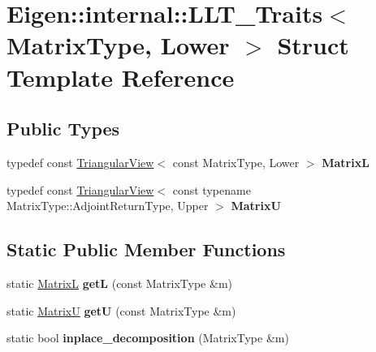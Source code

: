 \hypertarget{struct_eigen_1_1internal_1_1_l_l_t___traits_3_01_matrix_type_00_01_lower_01_4}{}\section{Eigen\+::internal\+::L\+L\+T\+\_\+\+Traits$<$ Matrix\+Type, Lower $>$ Struct Template Reference}
\label{struct_eigen_1_1internal_1_1_l_l_t___traits_3_01_matrix_type_00_01_lower_01_4}
\subsection*{Public Types}
\begin{DoxyCompactItemize}
\item 
\mbox{\label{struct_eigen_1_1internal_1_1_l_l_t___traits_3_01_matrix_type_00_01_lower_01_4_a66962242a7b894516b50903e48eaa502}} 
typedef const \mbox{\hyperlink{class_eigen_1_1_triangular_view}{Triangular\+View}}$<$ const Matrix\+Type, Lower $>$ {\bfseries MatrixL}
\item 
\mbox{\label{struct_eigen_1_1internal_1_1_l_l_t___traits_3_01_matrix_type_00_01_lower_01_4_a594ab80db6d0871384036e44409c84fd}} 
typedef const \mbox{\hyperlink{class_eigen_1_1_triangular_view}{Triangular\+View}}$<$ const typename Matrix\+Type\+::\+Adjoint\+Return\+Type, Upper $>$ {\bfseries MatrixU}
\end{DoxyCompactItemize}
\subsection*{Static Public Member Functions}
\begin{DoxyCompactItemize}
\item 
\mbox{\label{struct_eigen_1_1internal_1_1_l_l_t___traits_3_01_matrix_type_00_01_lower_01_4_a67fc88773f9c99869f98f9f8e817dfb7}} 
static \mbox{\hyperlink{class_eigen_1_1_triangular_view}{MatrixL}} {\bfseries getL} (const Matrix\+Type \&m)
\item 
\mbox{\label{struct_eigen_1_1internal_1_1_l_l_t___traits_3_01_matrix_type_00_01_lower_01_4_a73e538f3b3db2fecc4563ac99858254e}} 
static \mbox{\hyperlink{class_eigen_1_1_triangular_view}{MatrixU}} {\bfseries getU} (const Matrix\+Type \&m)
\item 
\mbox{\label{struct_eigen_1_1internal_1_1_l_l_t___traits_3_01_matrix_type_00_01_lower_01_4_a218dbb937419b97f2c55bc3ea9b0945a}} 
static bool {\bfseries inplace\+\_\+decomposition} (Matrix\+Type \&m)
\end{DoxyCompactItemize}


